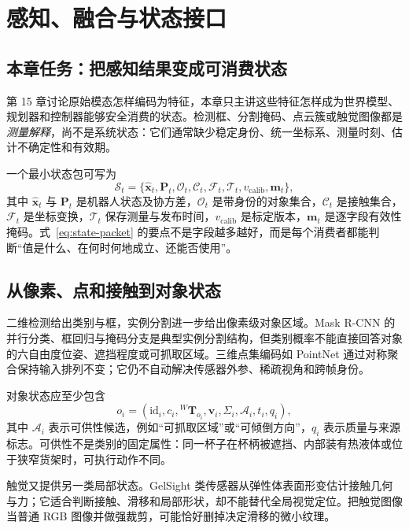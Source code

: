 \chapter{感知、融合与状态接口}
\label{chap:perception-state-interface}

\section{本章任务：把感知结果变成可消费状态}

第 15 章讨论原始模态怎样编码为特征，本章只主讲这些特征怎样成为世界模型、规划器和控制器能够安全消费的状态。检测框、分割掩码、点云簇或触觉图像都是\emph{测量解释}，尚不是系统状态：它们通常缺少稳定身份、统一坐标系、测量时刻、估计不确定性和有效期。

一个最小状态包可写为
\begin{equation}
\mathcal{S}_t=\{\hat{\bm{x}}_t,\bm{P}_t,\mathcal{O}_t,\mathcal{C}_t,
\mathcal{F}_t,\mathcal{T}_t,v_{\mathrm{calib}},\bm{m}_t\},
\label{eq:state-packet}
\end{equation}
其中 $\hat{\bm{x}}_t$ 与 $\bm{P}_t$ 是机器人状态及协方差，$\mathcal{O}_t$ 是带身份的对象集合，$\mathcal{C}_t$ 是接触集合，$\mathcal{F}_t$ 是坐标变换，$\mathcal{T}_t$ 保存测量与发布时间，$v_{\mathrm{calib}}$ 是标定版本，$\bm{m}_t$ 是逐字段有效性掩码。式~\eqref{eq:state-packet} 的要点不是字段越多越好，而是每个消费者都能判断“值是什么、在何时何地成立、还能否使用”。

\section{从像素、点和接触到对象状态}

二维检测给出类别与框，实例分割进一步给出像素级对象区域。Mask R-CNN 的并行分类、框回归与掩码分支是典型实例分割结构\cite{he2017maskrcnn}，但类别概率不能直接回答对象的六自由度位姿、遮挡程度或可抓取区域。三维点集编码如 PointNet 通过对称聚合保持输入排列不变\cite{qi2017pointnet}；它仍不自动解决传感器外参、稀疏视角和跨帧身份。

对象状态应至少包含
\begin{equation}
o_i=(\mathrm{id}_i,c_i,{}^W\bm{T}_{o_i},\bm{v}_i,\Sigma_i,
\mathcal{A}_i,t_i,q_i),
\end{equation}
其中 $\mathcal{A}_i$ 表示可供性候选，例如“可抓取区域”或“可倾倒方向”，$q_i$ 表示质量与来源标志。可供性不是类别的固定属性：同一杯子在杯柄被遮挡、内部装有热液体或位于狭窄货架时，可执行动作不同。

触觉又提供另一类局部状态。GelSight 类传感器从弹性体表面形变估计接触几何与力\cite{yuan2017gelsight}；它适合判断接触、滑移和局部形状，却不能替代全局视觉定位。把触觉图像当普通 RGB 图像并做强裁剪，可能恰好删掉决定滑移的微小纹理。

